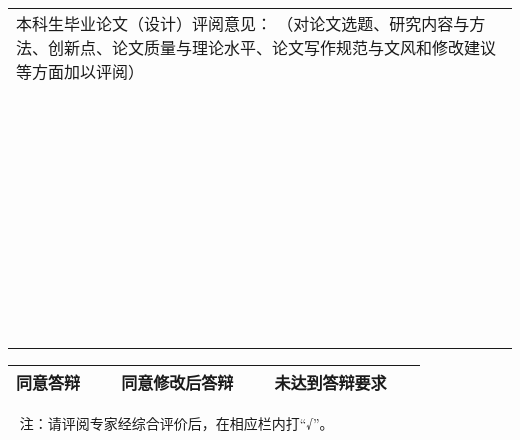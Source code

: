 {{\begin{center}
\begin{adjustbox}{minipage=16.83cm, center}
			{\renewcommand{\arraystretch}{1.5}
			\begin{tabularx}{\textwidth}{|X|}
				本科生毕业论文（设计）评阅意见：
				{\zihao{-5}（对论文选题、研究内容与方法、创新点、论文质量与理论水平、论文写作规范与文风和修改建议等方面加以评阅）} \\
				~                                                               \\
				~                                                               \\
				~                                                               \\
				~                                                               \\
				~                                                               \\
				~                                                               \\
				~                                                               \\
				~                                                               \\
				~                                                               \\
				\hline
			\end{tabularx}}

			\begin{tabularx}{\textwidth}{|p{2.54cm}|X|p{3.49cm}|X|p{3.49cm}|X|}
				同意答辩 & ~ & 同意修改后答辩 & ~ & 未达到答辩要求 & ~ \\ \hline
			\end{tabularx}
		\end{adjustbox}
	\end{center}

	\par ~
	\vfill
	{ 注：请评阅专家经综合评价后，在相应栏内打“√”。}
}
}